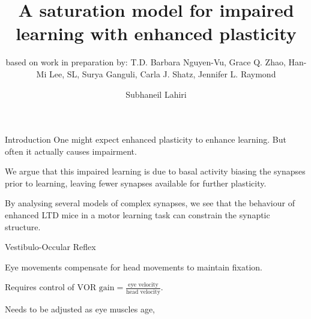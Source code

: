 \documentclass{beamer}%
\title[Saturation by enh. plasticity impairs learning]{A saturation model for impaired learning with enhanced plasticity}
\subtitle{\small{based on work in preparation by: T.D. Barbara Nguyen-Vu, Grace Q. Zhao, Han-Mi Lee, SL, Surya Ganguli, Carla J. Shatz, Jennifer L. Raymond
}}
\author{Subhaneil Lahiri%
}
\institute[Stanford]{%
Stanford University, Applied Physics
}
\begin{document}

\begin{frame}
%
 \titlepage
%
\end{frame}


\begin{frame}{Introduction}
%
 One might expect enhanced plasticity to enhance learning.
 But often it actually causes impairment.

 \vp We argue that this impaired learning is due to basal activity biasing the synapses prior to learning, leaving fewer synapses available for further plasticity.

 \vp By analysing several models of complex synapses, we see that the behaviour of enhanced LTD mice in a motor learning task can constrain the synaptic structure.
%
\end{frame}

%
%
%
%

\begin{frame}{Vestibulo-Occular Reflex}
%
 \parbox[t]{0.4\linewidth}{}
 \parbox[t]{0.59\linewidth}{%
 Eye movements compensate for head movements to maintain fixation.

 \vp Requires control of $\text{VOR gain} = \frac{\text{eye velocity}}{\text{head velocity}}$.

 \vp Needs to be adjusted as eye muscles age, \etc
 }

%
\end{frame}


\end{document}

